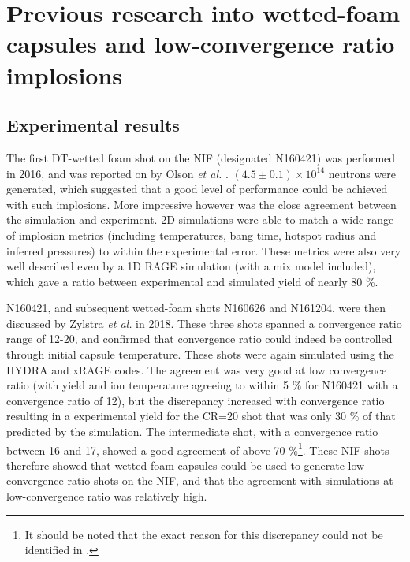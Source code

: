 \section{Previous research into wetted-foam capsules and low-convergence ratio implosions} \label{sec: PreviousLowCRResults}

\subsection{Experimental results}

The first DT-wetted foam shot on the NIF (designated N160421) was performed in 2016, and was reported on by Olson \textit{et al.} \cite{Olson2016}. $(4.5 \pm 0.1) \times 10^{14}$ neutrons were generated, which suggested that a good level of performance could be achieved with such implosions. More impressive however was the close agreement between the simulation and experiment. 2D simulations were able to match a wide range of implosion metrics (including temperatures, bang time, hotspot radius and inferred pressures) to within the experimental error. These metrics were also very well described even by a 1D RAGE simulation (with a mix model included), which gave a ratio between experimental and simulated yield of nearly 80 \%. 

N160421, and subsequent wetted-foam shots N160626 and N161204, were then discussed by Zylstra \textit{et al.} \cite{Zylstra2018} in 2018. These three shots spanned a convergence ratio range of 12-20, and confirmed that convergence ratio could indeed be controlled through initial capsule temperature. These shots were again simulated using the HYDRA and xRAGE codes. The agreement was very good at low convergence ratio (with yield and ion temperature agreeing to within 5 \% for N160421 with a convergence ratio of 12), but the discrepancy increased with convergence ratio resulting in a experimental yield for the CR=20 shot that was only 30 \% of that predicted by the simulation. The intermediate shot, with a convergence ratio between 16 and 17, showed a good agreement of above 70 \%\footnote{It should be noted that the exact reason for this discrepancy could not be identified in \cite{Zylstra2018}.}. These NIF shots therefore showed that wetted-foam capsules could be used to generate low-convergence ratio shots on the NIF, and that the agreement with simulations at low-convergence ratio was relatively high.

